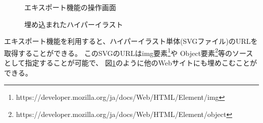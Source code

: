 \begin{figure}[htbp] \begin{minipage}{0.5\hsize}
                         \begin{center} 
                         \end{center} \caption{エキスポート機能の操作画面} \label{fig:exporting1}
\end{minipage} \begin{minipage}{0.5\hsize}
                   \begin{center} 
                   \end{center} \caption{埋め込まれたハイパーイラスト} \label{fig:exporting2}
\end{minipage}
\end{figure}
エキスポート機能を利用すると、ハイパーイラスト単体(SVGファイル)のURLを取得することができる。
このSVGのURLはimg要素\footnote{https://developer.mozilla.org/ja/docs/Web/HTML/Element/img}や
Object要素\footnote{https://developer.mozilla.org/ja/docs/Web/HTML/Element/object}等のソースとして指定することが可能で、
図\ref{fig:exporting2}のように他のWebサイトにも埋めこむことができる。